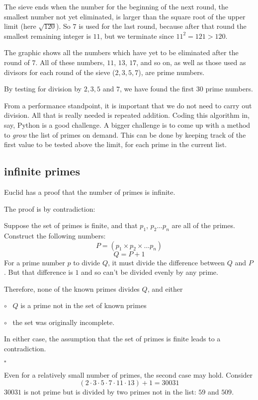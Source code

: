\documentclass[11pt, oneside]{article}
\begin{document}
The sieve ends when the number for the beginning of the next round, the smallest number not yet eliminated, is larger than the square root of the upper limit (here $\sqrt{120}$).  So $7$ is used for the last round, because after that round the smallest remaining integer is $11$, but we terminate since $11^2 = 121 > 120$.

The graphic shows all the numbers which have yet to be eliminated after the round of $7$.   All of these numbers, $11$, $13$, $17$, and so on, as well as those used as divisors for each round of the sieve ($2, 3, 5, 7$), are prime numbers.

By testing for division by $2, 3, 5$ and $7$, we have found the first $30$ prime numbers.

From a performance standpoint, it is important that we do not need to carry out division.  All that is really needed is repeated addition.  Coding this algorithm in, say, Python is a good challenge.  A bigger challenge is to come up with a method to \emph{grow} the list of primes on demand.  This can be done by keeping track of the first value to be tested above the limit, for each prime in the current list.

\subsection*{infinite primes}

Euclid has a proof that the number of primes is infinite.

The proof is by contradiction:

Suppose the set of primes is finite, and that $p_1$, $p_2 \dots p_n$ are all of the primes.  Construct the following numbers:
\[ P = (p_1 \times p_2 \times \dots p_n)  \]
\[ Q = P + 1 \]
For a prime number $p$ to divide $Q$, it must divide the difference between $Q$ and $P$.  But that difference is $1$ and so can't be divided evenly by any prime.

Therefore, none of the known primes divides $Q$, and either

$\circ$ \  $Q$ is a prime not in the set of known primes

$\circ$ \ the set was originally incomplete.

In either case, the assumption that the set of primes is finite leads to a contradiction.

$\square$

Even for a relatively small number of primes, the second case may hold.  Consider
\[ (2 \cdot 3 \cdot 5 \cdot 7 \cdot 11 \cdot 13) + 1 = 30031 \]
$30031$ is not prime but is divided by two primes not in the list:  $59$ and $509$.
\end{document}

